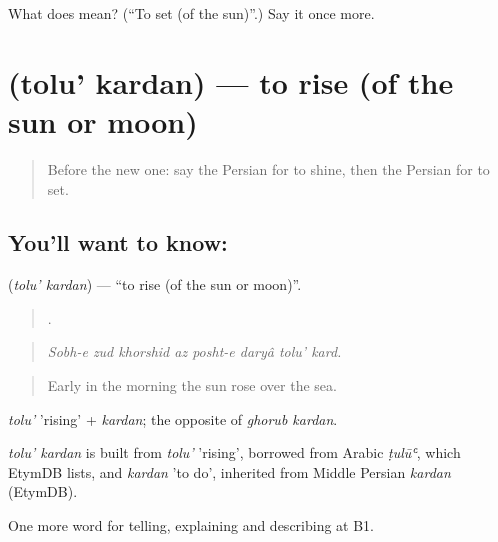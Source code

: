 \begin{tcolorbox}[breakable,colback=teal!4,colframe=teal!35!black,title={Before you move on}]
What does   mean? (\textquotedblleft{}To set (of the sun)\textquotedblright{}.) Say it once more.
\end{tcolorbox}
\section[\texorpdfstring{\fa{طلوع} \fa{کردن} (tolu' kardan)}{طلوع کردن (tolu' kardan)}]{  (tolu' kardan) — to rise (of the sun or moon)}

\label{lesson:FA-C479-tolu-kardan}



\begin{quote}
Before the new one: say the Persian for to shine, then the Persian for to set.
\end{quote}

\subsection*{You'll want to know:  }
\textbf{ } (\emph{tolu' kardan}) — \textquotedblleft{}to rise (of the sun or moon)\textquotedblright{}.

\begin{quote}
       .
\end{quote}

\begin{quote}
\emph{Sobh-e zud khorshid az posht-e daryâ tolu' kard.}
\end{quote}

\begin{quote}
Early in the morning the sun rose over the sea.
\end{quote}

\emph{tolu'} 'rising' + \emph{kardan}; the opposite of \emph{ghorub kardan}.

\begin{cousinweb}
\emph{tolu' kardan} is built from \emph{tolu'} 'rising', borrowed from Arabic \emph{ṭulūʿ}, which EtymDB lists, and \emph{kardan} 'to do', inherited from Middle Persian \emph{kardan} (EtymDB).
\end{cousinweb}

\begin{grammarlens}[title={What you've built}]
One more word for telling, explaining and describing at B1.
\end{grammarlens}

